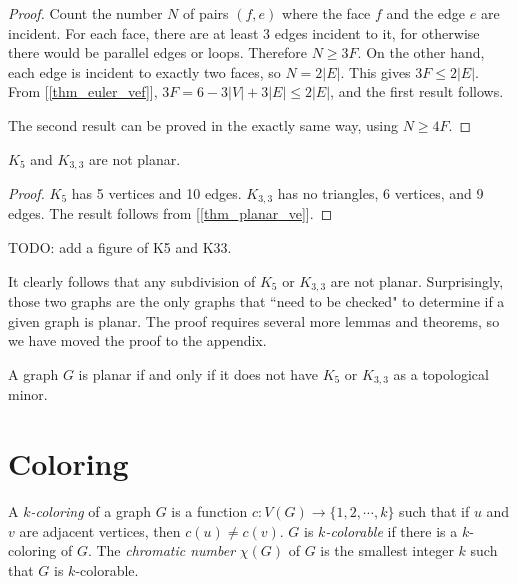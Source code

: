         \begin{proof}
            Count the number $N$ of pairs $(f, e)$ where the face $f$ and the edge $e$ are incident. For each face, there are at least 3 edges incident to it, for otherwise there would be parallel edges or loops. Therefore $N \geq 3F$. On the other hand, each edge is incident to exactly two faces, so $N = 2|E|$. This gives $3F \leq 2|E|$. From [\ref{thm_euler_vef}], $3F = 6-3|V|+3|E| \leq 2|E|$, and the first result follows.
            
            The second result can be proved in the exactly same way, using $N \geq 4F$.
        \end{proof}
        
        \begin{coro} \label{cor_k5_k33}
            $K_5$ and $K_{3,3}$ are not planar.
        \end{coro}
        
        \begin{proof}
            $K_5$ has 5 vertices and 10 edges. $K_{3,3}$ has no triangles, 6 vertices, and 9 edges. The result follows from [\ref{thm_planar_ve}].
        \end{proof}
        
        TODO: add a figure of K5 and K33.
        
        It clearly follows that any subdivision of $K_5$ or $K_{3,3}$ are not planar. Surprisingly, those two graphs are the only graphs that ``need to be checked" to determine if a given graph is planar. The proof requires several more lemmas and theorems, so we have moved the proof to the appendix.
        
        \begin{thm} \label{thm_kuratowski}
            A graph $G$ is planar if and only if it does not have $K_5$ or $K_{3,3}$ as a topological minor.
        \end{thm}
    
    \section{Coloring}
        \begin{defn}[Coloring] \label{def_coloring}
            A \emph{$k$-coloring} of a graph $G$ is a function $c: V(G) \to \{1,2,\cdots,k\}$ such that if $u$ and $v$ are adjacent vertices, then $c(u) \neq c(v)$. $G$ is \emph{$k$-colorable} if there is a $k$-coloring of $G$. The \emph{chromatic number} $\chi(G)$ of $G$ is the smallest integer $k$ such that $G$ is $k$-colorable.
        \end{defn}
        
